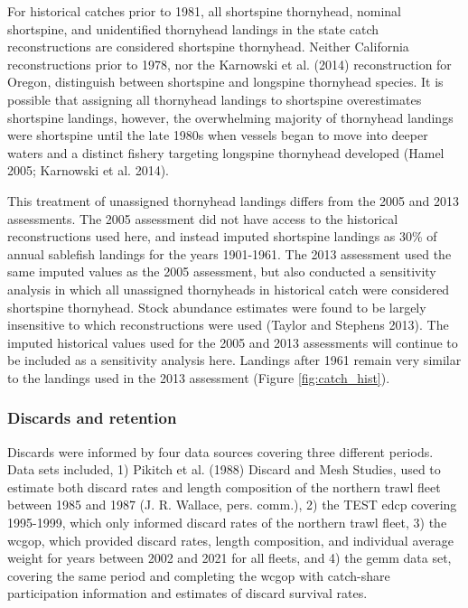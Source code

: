 \documentclass[11pt,
  english,
  letterpaper,
]{article}
\begin{document}
For historical catches prior to 1981, all shortspine thornyhead, nominal shortspine, and unidentified thornyhead landings in the state catch reconstructions are considered shortspine thornyhead. Neither California reconstructions prior to 1978, nor the Karnowski et al. (2014) reconstruction for Oregon, distinguish between shortspine and longspine thornyhead species. It is possible that assigning all thornyhead landings to shortspine overestimates shortspine landings, however, the overwhelming majority of thornyhead landings were shortspine until the late 1980s when vessels began to move into deeper waters and a distinct fishery targeting longspine thornyhead developed (Hamel 2005; Karnowski et al. 2014).

This treatment of unassigned thornyhead landings differs from the 2005 and 2013 assessments. The 2005 assessment did not have access to the historical reconstructions used here, and instead imputed shortspine landings as 30\% of annual sablefish landings for the years 1901-1961. The 2013 assessment used the same imputed values as the 2005 assessment, but also conducted a sensitivity analysis in which all unassigned thornyheads in historical catch were considered shortspine thornyhead. Stock abundance estimates were found to be largely insensitive to which reconstructions were used (Taylor and Stephens 2013). The imputed historical values used for the 2005 and 2013 assessments will continue to be included as a sensitivity analysis here. Landings after 1961 remain very similar to the landings used in the 2013 assessment (Figure \ref{fig:catch_hist}).

\hypertarget{discards-and-retention}{%
\subsubsection{Discards and retention}\label{discards-and-retention}}

Discards were informed by four data sources covering three different periods. Data sets included, 1) Pikitch et al. (1988) Discard and Mesh Studies, used to estimate both discard rates and length composition of the northern trawl fleet between 1985 and 1987 (J. R. Wallace, pers. comm.), 2) the TEST \gls{edcp} covering 1995-1999, which only informed discard rates of the northern trawl fleet, 3) the \gls{wcgop}, which provided discard rates, length composition, and individual average weight for years between 2002 and 2021 for all fleets, and 4) the \gls{gemm} data set, covering the same period and completing the \gls{wcgop} with catch-share participation information and estimates of discard survival rates.
\end{document}
